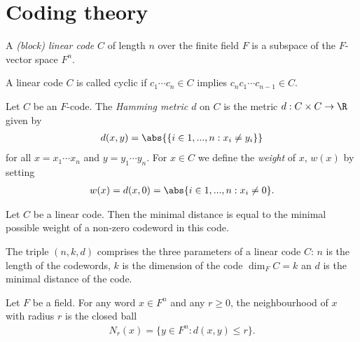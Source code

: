 \documentclass{article}
\begin{document}
\section{Coding theory}

\begin{definition}[Lecture 9]
	A \emph{(block) linear code} $C$ of length $n$ over the finite field $F$ is a subspace of the
	$F$-vector space $F^n$.
\end{definition}

\begin{definition}
	A linear code $C$ is called cyclic if $c_1\cdots c_n\in C$ implies $c_nc_1\cdots c_{n-1}\in C$.
\end{definition}

\begin{definition}
	Let $C$ be an $F$-code. The \emph{Hamming metric $d$} on $C$ is the metric
	$d:C\times C\to\R$ given by
	\begin{align*}
		d(x,y) = \abs{\{i\in{1,...,n}:x_i\not=y_i\}}
	\end{align*}
	for all $x=x_1\cdots x_n$ and $y=y_1\cdots y_n$.
	For $x\in C$ we define the \emph{weight} of $x$, $w(x)$ by setting
	\begin{align*}
		w(x)=d(x,0)=\abs\{i\in {1,...,n} : x_i\not=0\}.
	\end{align*}
\end{definition}

\begin{lemma}[Lecture 10]
	Let $C$ be a linear code. Then the minimal distance is equal to the minimal possible weight
	of a non-zero codeword in this code.
\end{lemma}

\begin{definition}[Lecture 10]
	The triple $(n,k,d)$ comprises the three parameters of a linear code $C$: $n$ is the length of the
	codewords, $k$ is the dimension of the code $\dim_F C=k$ an $d$ is the minimal distance of the code.
\end{definition}

\begin{definition}[Lecture 10]
	Let $F$ be a field. For any word $x\in F^n$ and any $r\geq 0$, the neighbourhood of $x$ with radius
	$r$ is the closed ball
	\begin{align*}
		N_r(x)=\{y\in F^n : d(x,y)\leq r\}.
	\end{align*}
\end{definition}
\end{document}
